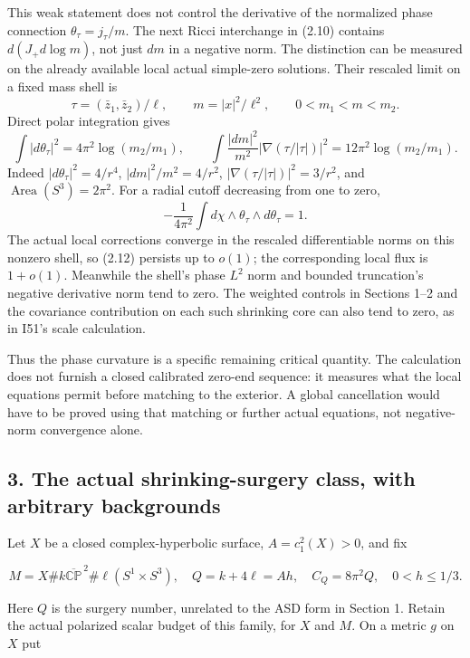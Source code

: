 \documentclass[
  10pt,
]{article}
\begin{document}
This weak statement does not control the derivative of the normalized
phase connection \(\theta_\tau=j_\tau/m\). The next Ricci interchange in
(2.10) contains \(d(J_+d\log m)\), not just \(dm\) in a negative norm.
The distinction can be measured on the already available local actual
simple-zero solutions. Their rescaled limit on a fixed mass shell is \[
 \tau=(\bar z_1,\bar z_2)/\ell,\qquad m=|x|^2/\ell^2,
 \qquad 0<m_1<m<m_2.
\] Direct polar integration gives \[
 \int|d\theta_\tau|^2=4\pi^2\log(m_2/m_1),\qquad
 \int\frac{|dm|^2}{m^2}|\nabla(\tau/|\tau|)|^2
       =12\pi^2\log(m_2/m_1). \tag{2.12}
\] Indeed \(|d\theta_\tau|^2=4/r^4\), \(|dm|^2/m^2=4/r^2\),
\(|\nabla(\tau/|\tau|)|^2=3/r^2\), and
\(\operatorname{Area}(S^3)=2\pi^2\). For a radial cutoff decreasing from
one to zero, \[
 -\frac{1}{4\pi^2}\int d\chi\wedge\theta_\tau\wedge d\theta_\tau=1.
 \tag{2.13}
\] The actual local corrections converge in the rescaled differentiable
norms on this nonzero shell, so (2.12) persists up to \(o(1)\); the
corresponding local flux is \(1+o(1)\). Meanwhile the shell's phase
\(L^2\) norm and bounded truncation's negative derivative norm tend to
zero. The weighted controls in Sections 1--2 and the covariance
contribution on each such shrinking core can also tend to zero, as in
I51's scale calculation.

Thus the phase curvature is a specific remaining critical quantity. The
calculation does not furnish a closed calibrated zero-end sequence: it
measures what the local equations permit before matching to the
exterior. A global cancellation would have to be proved using that
matching or further actual equations, not negative-norm convergence
alone.

\hypertarget{the-actual-shrinking-surgery-class-with-arbitrary-backgrounds}{%
\subsection{3. The actual shrinking-surgery class, with arbitrary
backgrounds}\label{the-actual-shrinking-surgery-class-with-arbitrary-backgrounds}}

Let \(X\) be a closed complex-hyperbolic surface, \(A=c_1^2(X)>0\), and
fix

\[
 M=X\#k\overline{\mathbb{CP}}^{\,2}\#\ell(S^1\times S^3),
 \quad Q=k+4\ell=Ah,\quad C_Q=8\pi^2Q,
 \quad 0<h\le1/3.
\]

Here \(Q\) is the surgery number, unrelated to the ASD form in Section
1. Retain the actual polarized scalar budget of this family, for \(X\)
and \(M\). On a metric \(g\) on \(X\) put
\end{document}
